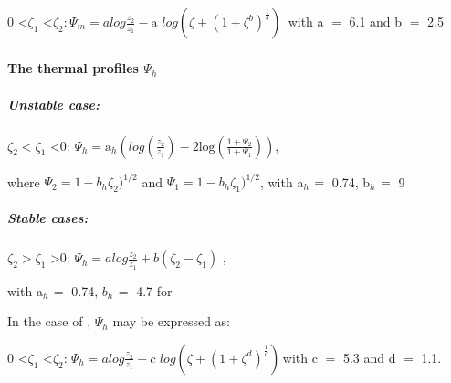 0 \textless $\zeta_{1}$ \textless $\zeta_{2}$:$_{\, }\Psi_{m} =alog\frac{z_{2} }{z_{1}
}-\mbox{a}\,\,log\left( {\zeta+\left( {1+\zeta^{b}} \right)^{\frac{1}{b}}} \right)_{\, }$ with a
$=$ 6.1 and b $=$ 2.5

\paragraph{The thermal profiles $\Psi_{h}$}

\subparagraph{Unstable case:}

$\zeta_{2 }< \zeta_{1}$ \textless 0: $\Psi_{h}
=\mbox{a}_{h} \left( {log\left( {\frac{z_{2}
}{z_{1} }} \right)-\mbox{2log}\left(
{\frac{1+\Psi_{2} }{1+\Psi_{1}
}} \right)} \right)$,

where $\Psi_{2} =1-b_{h} \zeta_{2} )^{1/2}$ and $\Psi_{1}
=1-b_{h} \zeta_{1}
)^{1/2}$, with a$_{h\, }=$ 0.74, b$_{h\, }=$ 9

\subparagraph{Stable cases:}

$\zeta_{2 }> \zeta_{1}$ \textgreater 0: $\Psi_{h}
=alog\frac{z_{2} }{z_{1} }+b(\zeta_{2} -\zeta_{1} )$ ,

with a$_{h\, }=$ 0.74, $b_{h\, }= $ 4.7 for \cite{Businger:1971}

In the case of \cite{Cheng:2005}, $\Psi_{h}$ may be expressed as:

0 \textless $\zeta_{1}$ \textless $\zeta_{2}$:$_{\, \, }\Psi_{h} =alog\frac{z_{2} }{z_{1}
}-c\,\,log\left( {\zeta+\left( {1+\zeta^{d}} \right)^{\frac{1}{d}}} \right)_{\, }$with c
$=$ 5.3 and d $=$ 1.1.

